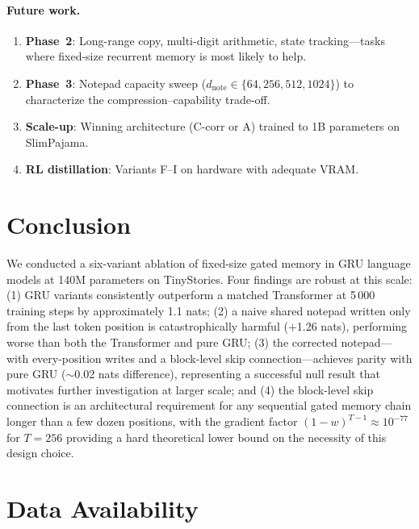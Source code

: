 \documentclass[11pt,a4paper]{article}
\begin{document}
\paragraph{Future work.}
\begin{enumerate}
  \item \textbf{Phase~2}: Long-range copy, multi-digit arithmetic, state
        tracking---tasks where fixed-size recurrent memory is most likely
        to help.
  \item \textbf{Phase~3}: Notepad capacity sweep
        ($d_\text{note} \in \{64, 256, 512, 1024\}$) to characterize the
        compression--capability trade-off.
  \item \textbf{Scale-up}: Winning architecture (C-corr or A) trained to 1B
        parameters on SlimPajama.
  \item \textbf{RL distillation}: Variants F--I on hardware with adequate
        VRAM.
\end{enumerate}

\section{Conclusion}
\label{sec:conclusion}

We conducted a six-variant ablation of fixed-size gated memory in GRU
language models at 140M parameters on TinyStories.  Four findings are
robust at this scale: (1) GRU variants consistently outperform a matched
Transformer at 5\,000 training steps by approximately 1.1 nats;
(2) a naive shared notepad written only from the last token position is
catastrophically harmful ($+$1.26 nats), performing worse than both the
Transformer and pure GRU; (3) the corrected notepad---with every-position
writes and a block-level skip connection---achieves parity with pure GRU
($\sim$0.02 nats difference), representing a successful null result that
motivates further investigation at larger scale; and (4) the block-level
skip connection is an architectural requirement for any sequential gated
memory chain longer than a few dozen positions, with the gradient factor
$(1-w)^{T-1} \approx 10^{-77}$ for $T{=}256$ providing a hard theoretical
lower bound on the necessity of this design choice.

\section*{Data Availability}
\end{document}
